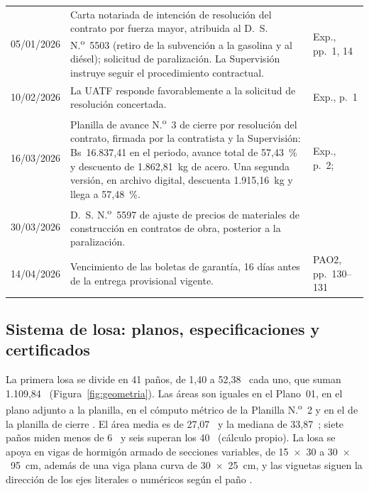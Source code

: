 \begin{longtable}{@{}P{2.3cm}P{10.4cm}P{2.8cm}@{}}
05/01/2026 & Carta notariada de intención de resolución del contrato por fuerza mayor, atribuida al D.~S. N.\textsuperscript{o}~5503 (retiro de la subvención a la gasolina y al diésel); solicitud de paralización. La Supervisión instruye seguir el procedimiento contractual. & Exp., pp.~1, 14 \\
10/02/2026 & La UATF responde favorablemente a la solicitud de resolución concertada. & Exp., p.~1 \\
16/03/2026 & Planilla de avance N.\textsuperscript{o}~3 de cierre por resolución del contrato, firmada por la contratista y la Supervisión: Bs~16.837,41 en el periodo, avance total de 57,43~\% y descuento de 1.862,81~kg de acero. Una segunda versión, en archivo digital, descuenta 1.915,16~kg y llega a 57,48~\%. & Exp., p.~2; \textcite{uatf_pao3} \\
30/03/2026 & D.~S. N.\textsuperscript{o}~5597 de ajuste de precios de materiales de construcción en contratos de obra, posterior a la paralización. & \textcite{ds5597_2026} \\
14/04/2026 & Vencimiento de las boletas de garantía, 16 días antes de la entrega provisional vigente. & PAO2, pp.~130--131 \\
\end{longtable}
\vspace{-6pt}
\endgroup

\subsection{Sistema de losa: planos, especificaciones y certificados}
\label{sec:sistema-losa}

La primera losa se divide en 41 paños, de 1,40 a 52,38~\mdos{} cada uno, que suman 1.109,84~\mdos{} (Figura~\ref{fig:geometria}). Las áreas son iguales en el Plano~01, en el plano adjunto a la planilla, en el cómputo métrico de la Planilla N.\textsuperscript{o}~2 y en el de la planilla de cierre \parencite[pp.~28--29, 60]{uatf2025pao2}. El área media es de 27,07~\mdos{} y la mediana de 33,87~\mdos{}; siete paños miden menos de 6~\mdos{} y seis superan los 40~\mdos{} (cálculo propio). La losa se apoya en vigas de hormigón armado de secciones variables, de 15~$\times$~30 a 30~$\times$~95~cm, además de una viga plana curva de 30~$\times$~25~cm, y las viguetas siguen la dirección de los ejes literales o numéricos según el paño \parencite[Plano~03]{uatf_planos}.

